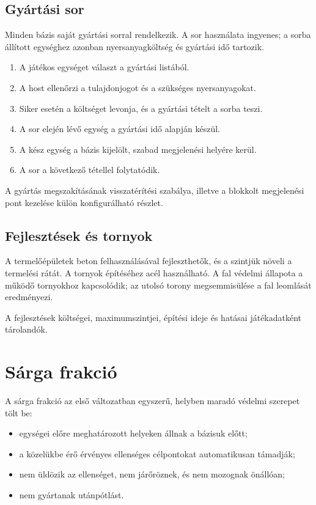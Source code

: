 \documentclass[12pt,a4paper]{article}
\begin{document}
\subsection{Gyártási sor}

Minden bázis saját gyártási sorral rendelkezik. A sor használata ingyenes; a sorba állított egységhez azonban nyersanyagköltség és gyártási idő tartozik.

\begin{enumerate}
  \item A játékos egységet választ a gyártási listából.
  \item A host ellenőrzi a tulajdonjogot és a szükséges nyersanyagokat.
  \item Siker esetén a költséget levonja, és a gyártási tételt a sorba teszi.
  \item A sor elején lévő egység a gyártási idő alapján készül.
  \item A kész egység a bázis kijelölt, szabad megjelenési helyére kerül.
  \item A sor a következő tétellel folytatódik.
\end{enumerate}

A gyártás megszakításának visszatérítési szabálya, illetve a blokkolt megjelenési pont kezelése külön konfigurálható részlet.

\subsection{Fejlesztések és tornyok}

A termelőépületek beton felhasználásával fejleszthetők, és a szintjük növeli a termelési rátát. A tornyok építéséhez acél használható. A fal védelmi állapota a működő tornyokhoz kapcsolódik; az utolsó torony megsemmisülése a fal leomlását eredményezi.

A fejlesztések költségei, maximumszintjei, építési ideje és hatásai játékadatként tárolandók.

\section{Sárga frakció}

A sárga frakció az első változatban egyszerű, helyben maradó védelmi szerepet tölt be:
\begin{itemize}
  \item egységei előre meghatározott helyeken állnak a bázisuk előtt;
  \item a közelükbe érő érvényes ellenséges célpontokat automatikusan támadják;
  \item nem üldözik az ellenséget, nem járőröznek, és nem mozognak önállóan;
  \item nem gyártanak utánpótlást.
\end{itemize}
\end{document}
